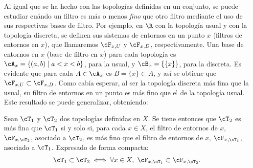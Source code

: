 \begin{amp}
    Al igual que se ha hecho con las topologías definidas en un conjunto, se puede estudiar cuándo un filtro es más o menos {\it fino} que otro filtro mediante el uso de sus respectivas bases de filtro. Por ejemplo, en $\R$ con la topología usual y con la topología discreta, se definen sus sistemas de entornos en un punto $x$ (filtros de entornos en $x$), que llamaremos $\cF_{x,U}$ y $\cF_{x,D}$, respectivamente. Una base de entornos en $x$ (base de filtro en $x$) para cada topología es $\cA_x = \{(a,b)\mid a<x<b\}$, para la usual, y $\cB_x = \{\{x\}\}$, para la discreta. Es evidente que para cada $A\in\cA_x$ es $B=\{x\}\subset A$, y así se obtiene que $\cF_{x,U} \subset \cF_{x,D}$. Como cabía esperar, al ser la topología discreta más fina que la usual, su filtro de entornos en un punto es más fino que el de la topología usual. Este resultado se puede generalizar, obteniendo:
    \begin{prop}
        Sean $\cT_1$ y $\cT_2$ dos topologías definidas en $X$. Se tiene entonces que $\cT_2$ es más fina que $\cT_1$ si y solo si, para cada $x\in X$, el filtro de entornos de $x$, $\cF_{x,\cT_2}$, asociado a $\cT_2$, es más fino que el filtro de entornos de $x$, $\cF_{x,\cT_1}$, asociado a $\cT_1$. Expresado de forma compacta:
        \[
            \cT_1\subset\cT_2  \iff \forall x\in X,\ \cF_{x,\cT_1}\subset \cF_{x,\cT_2}.
        \]
    \end{prop}

\end{amp}


{}

























